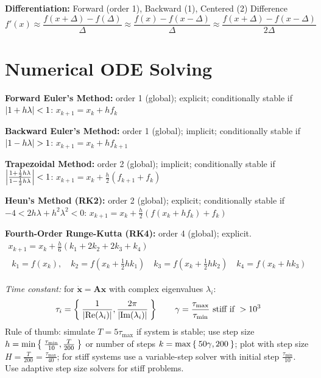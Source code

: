 \documentclass[twocolumn, 8pt]{extarticle}
\begin{document}
\textbf{Differentiation:} Forward (order 1), Backward (1), Centered (2) Difference
$$f'(x) \approx \frac{f(x + \Delta) - f(\Delta)}{\Delta} \approx \frac{f(x) - f(x - \Delta)}{\Delta} \approx \frac{f(x + \Delta) - f(x - \Delta)}{2\Delta}$$

\section{Numerical ODE Solving} %

\textbf{Forward Euler's Method:} order 1 (global); explicit; conditionally stable if $\abs{1 + h\lambda} < 1$:
$x_{k + 1} = x_k + hf_k$

\textbf{Backward Euler's Method:} order 1 (global); implicit; conditionally stable if $\abs{1 - h\lambda} > 1$:
$x_{k + 1} = x_k + hf_{k + 1}$

\textbf{Trapezoidal Method:} order 2 (global); implicit; conditionally stable if $\abs*{\frac{1 + \frac{1}{2}h\lambda}{1 - \frac{1}{2}h\lambda}} < 1$:
$x_{k + 1} = x_k + \frac{h}{2}(f_{k + 1} + f_k)$

\textbf{Heun's Method (RK2):} order 2 (global); explicit; conditionally stable if $-4 < 2h\lambda + h^2\lambda^2 < 0$:
$x_{k + 1} = x_k + \frac{h}{2}\left(f(x_k + hf_k) + f_k\right)$

\textbf{Fourth-Order Runge-Kutta (RK4):} order 4 (global); explicit.
\begin{gather*}
    x_{k + 1} = x_k + \frac{h}{6}(k_1 + 2k_2 + 2k_3 + k_4) \\
    \begin{aligned}
        \textstyle k_1 = f(x_k),\quad k_2 = f\left(x_k + \frac{1}{2}hk_1\right) \quad k_3 = f\left(x_k + \frac{1}{2}hk_2\right) \quad k_4 = f(x_k + hk_3)
    \end{aligned}
\end{gather*}

\textit{Time constant:} for $\dot{\bm x} = \bm A\bm x$ with complex eigenvalues $\lambda _i$:
$$\tau _i = \Set{\frac{1}{\abs{\Re(\lambda _i)}}, \frac{2\pi}{\abs{\Im(\lambda _i)}}} \qquad \gamma = \frac{\tau _\text{max}}{\tau _\text{min}} \text{ stiff if } > 10^3$$
Rule of thumb: simulate $T = 5\tau _\text{max}$ if system is stable; use step size $h = \min\Set{\frac{\tau _\text{min}}{10}, \frac{T}{200}}$ or number of steps $k = \max\Set{50\gamma, 200}$;
plot with step size $H = \frac{T}{200} = \frac{\tau _\text{max}}{40}$; for stiff systems use a variable-step solver with initial step $\frac{\tau _\text{min}}{10}$.
Use adaptive step size solvers for stiff problems.
\end{document}
